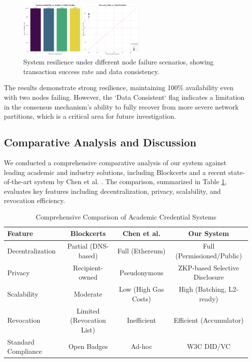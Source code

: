 \documentclass[lettersize,journal]{IEEEtran}
\begin{document}
\begin{itemize}
\begin{figure}[!t]
\centering
\includegraphics[width=2.5in]{figures/fig6_fault_tolerance.png}
\caption{System resilience under different node failure scenarios, showing transaction success rate and data consistency.}
\label{fig:exp6}
\end{figure}

The results demonstrate strong resilience, maintaining 100\% availability even with two nodes failing. However, the `Data Consistent` flag indicates a limitation in the consensus mechanism's ability to fully recover from more severe network partitions, which is a critical area for future investigation.

\subsection{Comparative Analysis and Discussion}

We conducted a comprehensive comparative analysis of our system against leading academic and industry solutions, including Blockcerts \cite{Blockcerts} and a recent state-of-the-art system by Chen et al. \cite{chen2023}. The comparison, summarized in Table \ref{tab:comparison}, evaluates key features including decentralization, privacy, scalability, and revocation efficiency.

\begin{table}[!t]
\caption{Comprehensive Comparison of Academic Credential Systems\label{tab:comparison}}
\centering
\begin{tabular}{|l|c|c|c|}
\hline
\textbf{Feature} & \textbf{Blockcerts \cite{Blockcerts}} & \textbf{Chen et al. \cite{chen2023}} & \textbf{Our System} \\
\hline
Decentralization & Partial (DNS-based) & Full (Ethereum) & Full (Permissioned/Public) \\
Privacy & Recipient-owned & Pseudonymous & ZKP-based Selective Disclosure \\
Scalability & Moderate & Low (High Gas Costs) & High (Batching, L2-ready) \\
Revocation & Limited (Revocation List) & Inefficient & Efficient (Accumulator) \\
Standard Compliance & Open Badges & Ad-hoc & W3C DID/VC \\
\hline
\end{tabular}
\end{table}


\end{itemize}
\end{document}
